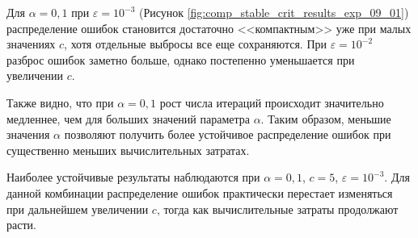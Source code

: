 Для $\alpha=0{,}1$ при $\varepsilon=10^{-3}$  (Рисунок \ref{fig:comp_stable_crit_results_exp_09_01}) распределение ошибок становится достаточно <<компактным>> уже при малых значениях $c$, хотя отдельные выбросы все еще сохраняются.  При $\varepsilon=10^{-2}$ разброс ошибок заметно больше, однако постепенно уменьшается при увеличении $c$.

Также видно, что при $\alpha=0{,}1$ рост числа итераций происходит значительно медленнее, чем для больших значений параметра $\alpha$. Таким образом, меньшие значения $\alpha$ позволяют получить более устойчивое распределение ошибок при существенно меньших вычислительных затратах.

Наиболее устойчивые результаты наблюдаются при $\alpha=0{,}1$, $c=5$, $\varepsilon = 10^{-3}$. Для данной комбинации распределение ошибок практически перестает изменяться при дальнейшем увеличении $c$, тогда как вычислительные затраты продолжают расти.




